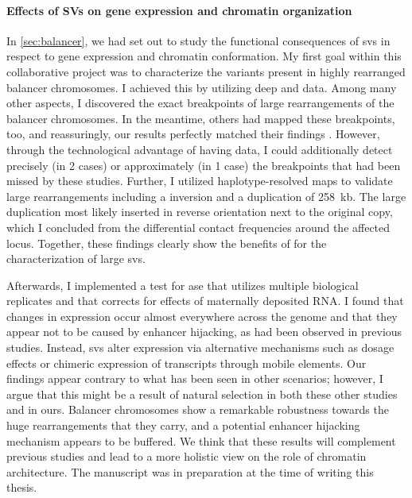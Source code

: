 \paragraph{Effects of SVs on gene expression and chromatin organization}
In \cref{sec:balancer}, we had set out to study the functional consequences of
\acp{sv} in respect to gene expression and chromatin conformation. My first goal
within this collaborative project was to characterize the variants present in
highly rearranged balancer chromosomes. I achieved this by utilizing deep \wgs
and \hic data. Among many other aspects, I discovered the exact breakpoints of
large rearrangements of the balancer chromosomes. In the meantime, others had
mapped these breakpoints, too, and reassuringly, our results perfectly matched
their findings \citep{Miller2016,Miller2018}. However, through the technological
advantage of having \hic data, I could additionally detect precisely (in 2
cases) or approximately (in 1 case) the breakpoints that had been missed by
these studies. Further, I utilized haplotype-resolved \hic maps to validate
large rearrangements including a inversion and a duplication of 258~kb. The
large duplication most likely inserted in reverse orientation next to the
original copy, which I concluded from the differential contact frequencies
around the affected locus. Together, these findings clearly show the benefits
of \hic for the characterization of large \acp{sv}.

Afterwards, I implemented a
test for \acl{ase} that utilizes multiple biological replicates and that
corrects for effects of maternally deposited RNA. I found that changes in
expression occur almost everywhere across the genome and that they appear not to
be caused by enhancer hijacking, as had been observed in previous studies.
Instead, \acp{sv} alter expression via alternative mechanisms such as dosage
effects or chimeric expression of transcripts through mobile elements. Our
findings appear contrary to what has been seen in other scenarios; however, I
argue that this might be a result of natural selection in both these other
studies and in ours. Balancer chromosomes show a remarkable robustness towards
the huge rearrangements that they carry, and a potential enhancer hijacking
mechanism appears to be buffered. We think that these results will complement
previous studies and lead to a more holistic view on the role of chromatin
architecture. The manuscript was in preparation at the time of writing this
thesis.


